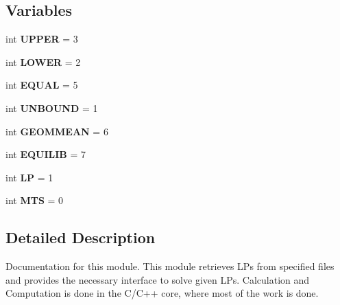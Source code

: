 \subsection*{Variables}
\begin{DoxyCompactItemize}
\item 
\hypertarget{namespacesymLPExperiments_a9a922fb530cc4e5f4b3815131fa3c371}{int {\bfseries U\-P\-P\-E\-R} = 3}\label{namespacesymLPExperiments_a9a922fb530cc4e5f4b3815131fa3c371}

\item 
\hypertarget{namespacesymLPExperiments_a59472bb37d81ca8001d5cc3353cf4eaa}{int {\bfseries L\-O\-W\-E\-R} = 2}\label{namespacesymLPExperiments_a59472bb37d81ca8001d5cc3353cf4eaa}

\item 
\hypertarget{namespacesymLPExperiments_a46b8d304e13a7c4130a3188af48eb75f}{int {\bfseries E\-Q\-U\-A\-L} = 5}\label{namespacesymLPExperiments_a46b8d304e13a7c4130a3188af48eb75f}

\item 
\hypertarget{namespacesymLPExperiments_a28e15d061ce80b2268c38cf230c47234}{int {\bfseries U\-N\-B\-O\-U\-N\-D} = 1}\label{namespacesymLPExperiments_a28e15d061ce80b2268c38cf230c47234}

\item 
\hypertarget{namespacesymLPExperiments_af086c1b10d5e4ab2988e689c83bf3f2b}{int {\bfseries G\-E\-O\-M\-M\-E\-A\-N} = 6}\label{namespacesymLPExperiments_af086c1b10d5e4ab2988e689c83bf3f2b}

\item 
\hypertarget{namespacesymLPExperiments_a973f0d69838ed63d09a2d13b5eb5f93a}{int {\bfseries E\-Q\-U\-I\-L\-I\-B} = 7}\label{namespacesymLPExperiments_a973f0d69838ed63d09a2d13b5eb5f93a}

\item 
\hypertarget{namespacesymLPExperiments_a6680909d6fdcc093706c541e3e3295ec}{int {\bfseries L\-P} = 1}\label{namespacesymLPExperiments_a6680909d6fdcc093706c541e3e3295ec}

\item 
\hypertarget{namespacesymLPExperiments_ae4e28dbe2606236884d4f5968b2784b6}{int {\bfseries M\-T\-S} = 0}\label{namespacesymLPExperiments_ae4e28dbe2606236884d4f5968b2784b6}

\end{DoxyCompactItemize}


\subsection{Detailed Description}
Documentation for this module. This module retrieves L\-Ps from specified files and provides the necessary interface to solve given L\-Ps. Calculation and Computation is done in the C/\-C++ core, where most of the work is done. 

